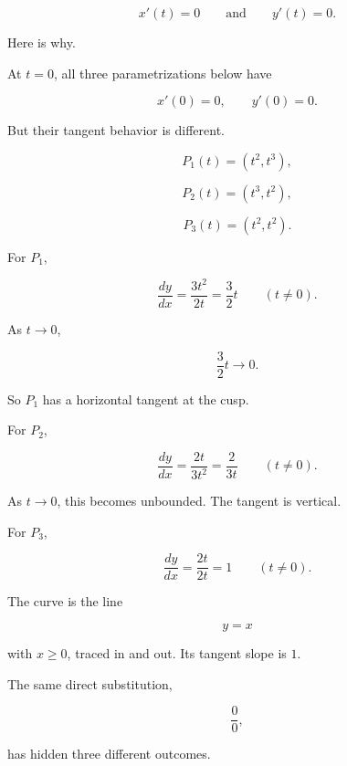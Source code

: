 \[
x'(t)=0
\qquad\text{and}\qquad
y'(t)=0.
\]

Here is why.

At \(t=0\), all three parametrizations below have

\[
x'(0)=0,
\qquad
y'(0)=0.
\]

But their tangent behavior is different.

\[
P_1(t)=(t^2,t^3),
\]

\[
P_2(t)=(t^3,t^2),
\]

\[
P_3(t)=(t^2,t^2).
\]

For \(P_1\),

\[
\frac{dy}{dx}
=
\frac{3t^2}{2t}
=
\frac32t
\qquad (t\neq0).
\]

As \(t\to0\),

\[
\frac32t\to0.
\]

So \(P_1\) has a horizontal tangent at the cusp.

For \(P_2\),

\[
\frac{dy}{dx}
=
\frac{2t}{3t^2}
=
\frac{2}{3t}
\qquad (t\neq0).
\]

As \(t\to0\), this becomes unbounded.  The tangent is vertical.

For \(P_3\),

\[
\frac{dy}{dx}
=
\frac{2t}{2t}
=
1
\qquad (t\neq0).
\]

The curve is the line

\[
y=x
\]

with \(x\ge0\), traced in and out.  Its tangent slope is \(1\).

The same direct substitution,

\[
\frac00,
\]

has hidden three different outcomes.

